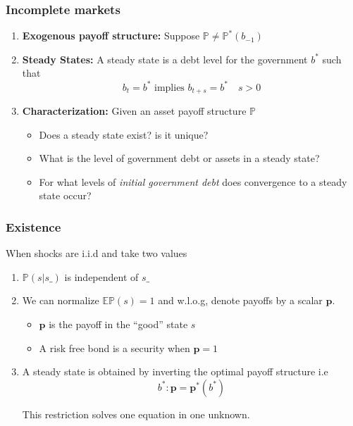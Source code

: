 \documentclass{beamer}
\begin{document}
 
% 
\begin{frame}
	\frametitle{Incomplete markets }
	\begin{enumerate}
		\item  \textbf{Exogenous payoff structure:} Suppose $\mathbb{P}\neq \mathbb{P}^*(b_{-1})$
		
		\item \textbf{Steady States: } A steady state is a debt level for the government $b^*$ such that 
		\[b_{t}=b^* \text{ implies } b_{t+s}=b^*\quad s>0\]
	
			
		\item \textbf{Characterization: } Given an asset payoff structure $\mathbb{P}$
		\begin{itemize}
			\item Does a steady state exist? is it unique?
			\item What is the level of government debt or   assets in a steady state?
			\item For what levels of  \emph{initial government debt} does  convergence to a steady state occur?
 			\end{itemize}
	\end{enumerate}
\end{frame}



 \begin{frame}
  \frametitle{Existence}
 
 
 When shocks are i.i.d and take two values
 
  \begin{enumerate}
 
\item $\mathbb{P}(s|s\_)$ is independent of $s\_$ 
\item We can normalize $\mathbb{E}\mathbb{P}(s)=1$ and w.l.o.g, denote payoffs by a scalar $\bm{p}$.
\begin{itemize}
 \item $\bm{p}$ is the payoff in the ``good'' state $s$
 \item A risk free bond is a security when $\bm{p}=1$
\end{itemize}

\item A steady state is obtained by inverting the optimal payoff structure i.e 
\begin{equation}
\label{eq-ss}
b^*: \bm{p}=\bm{p}^*(b^*)
\end{equation}

This restriction solves one equation in one unknown.  
\end{enumerate}
\end{frame}
\end{document}
